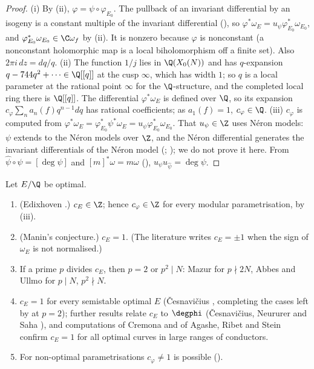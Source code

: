 \begin{proof}
(i) By (ii), $\varphi=\psi\circ\varphi_{E_0}$. The pullback of an invariant differential by an isogeny is a constant multiple of the invariant differential
(), so $\varphi^*\omega_E=u_\psi\varphi_{E_0}^*\omega_{E_0}$, and $\varphi_{E_0}^*\omega_{E_0}\in\C\omega_f$ by (ii). It is nonzero because $\varphi$ is
nonconstant (a nonconstant holomorphic map is a local biholomorphism off a finite set). Also $2\pi i\,dz=dq/q$.
(ii) The function $1/j$ lies in $\Q(X_0(N))$ and has $q$-expansion $q-744q^2+\cdots\in\Q[[q]]$ at the cusp $\infty$, which has width $1$; so $q$ is a local parameter at the rational point
$\infty$ for the $\Q$-structure, and the completed local ring there is $\Q[[q]]$. The differential $\varphi^*\omega_E$ is defined over $\Q$, so its expansion $c_\varphi\sum_na_n(f)q^{n-1}dq$ has
rational coefficients; as $a_1(f)=1$, $c_\varphi\in\Q$.
(iii) $c_\varphi$ is computed from $\varphi^*\omega_E=\varphi_{E_0}^*\psi^*\omega_E=u_\psi\varphi_{E_0}^*\omega_{E_0}$. That $u_\psi\in\Z$ uses N\'eron models: $\psi$ extends to the N\'eron models over $\Z$, and the
N\'eron differential generates the invariant differentials of the N\'eron model (; \cite[Chapter II]{Cremona97}); we do not prove it here. From $\hat\psi\circ\psi=[\deg\psi]$
and $[m]^*\omega=m\omega$ (), $u_\psi u_{\hat\psi}=\deg\psi$.
\end{proof}

\begin{theorem}\label{thm:moddeg:manin-known}
Let $E/\Q$ be optimal.
\begin{enumerate}[label=(\roman*)]
\item (Edixhoven \cite{Edixhoven91}.) $c_E\in\Z$; hence $c_\varphi\in\Z$ for every modular parametrisation, by (iii).
\item (Manin's conjecture.) $c_E=1$. (The literature writes $c_E=\pm1$ when the sign of $\omega_E$ is not normalised.)
\item If a prime $p$ divides $c_E$, then $p=2$ or $p^2\mid N$: Mazur \cite{Mazur78} for $p\nmid2N$, Abbes and Ullmo \cite{AU96} for $p\mid N$, $p^2\nmid N$.
\item $c_E=1$ for every semistable optimal $E$ (\v Cesnavi\v cius \cite{Cesnavicius18}, completing the cases left by \cite{Mazur78,AU96} at $p=2$); further results relate $c_E$ to
$\degphi$ (\v Cesnavi\v cius, Neururer and Saha \cite{CNS}), and computations of Cremona and of Agashe, Ribet and Stein \cite{ARS06} confirm $c_E=1$ for all optimal curves in large
ranges of conductors.
\item For non-optimal parametrisations $c_\varphi\ne1$ is possible ().
\end{enumerate}
\end{theorem}


